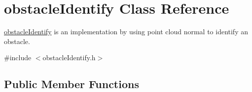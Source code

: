 \hypertarget{classobstacleIdentify}{}\section{obstacle\+Identify Class Reference}
\label{classobstacleIdentify}


\hyperlink{classobstacleIdentify}{obstacle\+Identify} is an implementation by using point cloud normal to identify an obstacle.
\begin{DoxyItemize}
\item 
\end{DoxyItemize} 




{\ttfamily \#include $<$obstacle\+Identify.\+h$>$}

\subsection*{Public Member Functions}
